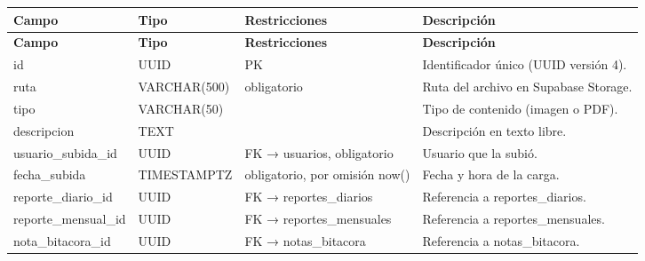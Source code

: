 \begin{xltabular}{\linewidth}{@{}>{\ttfamily\footnotesize}p{4.9cm}>{\ttfamily\footnotesize}p{2.4cm}>{\raggedright\arraybackslash\footnotesize}p{3.3cm}>{\footnotesize}X@{}}
\toprule\normalfont\sffamily\bfseries\footnotesize Campo & \normalfont\sffamily\bfseries\footnotesize Tipo & \sffamily\bfseries Restricciones & \sffamily\bfseries Descripción\\\midrule\endfirsthead
\toprule\normalfont\sffamily\bfseries\footnotesize Campo & \normalfont\sffamily\bfseries\footnotesize Tipo & \sffamily\bfseries Restricciones & \sffamily\bfseries Descripción\\\midrule\endhead
\bottomrule\endfoot
id & UUID & PK & Identificador único (UUID versión 4).\\
ruta & VARCHAR(500) & obligatorio & Ruta del archivo en Supabase Storage.\\
tipo & VARCHAR(50) &  & Tipo de contenido (imagen o PDF).\\
descripcion & TEXT &  & Descripción en texto libre.\\
usuario\_subida\_id & UUID & FK → usuarios, obligatorio & Usuario que la subió.\\
fecha\_subida & TIMESTAMPTZ & obligatorio, por omisión now() & Fecha y hora de la carga.\\
reporte\_diario\_id & UUID & FK → reportes\_diarios & Referencia a reportes\_diarios.\\
reporte\_mensual\_id & UUID & FK → reportes\_mensuales & Referencia a reportes\_mensuales.\\
nota\_bitacora\_id & UUID & FK → notas\_bitacora & Referencia a notas\_bitacora.\\
\end{xltabular}
